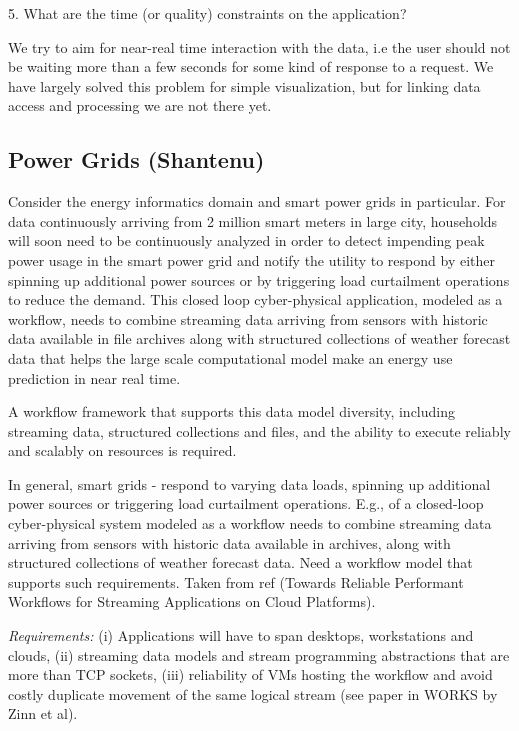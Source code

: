 \documentclass[preprint,12pt]{article}
\begin{document}
5.     What are the time (or quality) constraints on the application?

We try to aim for near-real time interaction with the data, i.e the user should not be waiting more than a few seconds for some kind of response to a request.  We have largely solved this problem for simple visualization, but for linking data access and processing we are not there yet.

\subsection{Power Grids (Shantenu) \label{powerShantenu}}

Consider the energy informatics domain and smart power grids in
particular. For data continuously arriving from 2 million smart meters
in large city, households will soon need to be continuously analyzed
in order to detect impending peak power usage in the smart power grid
and notify the utility to respond by either spinning up additional
power sources or by triggering load curtailment operations to reduce
the demand. This closed loop cyber-physical application, modeled as a
workflow, needs to combine streaming data arriving from sensors with
historic data available in file archives along with structured
collections of weather forecast data that helps the large scale
computational model make an energy use prediction in near real time.

A workflow framework that supports this data model diversity,
including streaming data, structured collections and files, and the
ability to execute reliably and scalably on resources is required.

In general, smart grids - respond to varying data loads, spinning up
additional power sources or triggering load curtailment operations.
E.g., of a closed-loop cyber-physical system modeled as a workflow
needs to combine streaming data arriving from sensors with historic
data available in archives, along with structured collections of
weather forecast data. Need a workflow model that supports such
requirements. Taken from ref (Towards Reliable Performant Workflows
for Streaming Applications on Cloud Platforms).


{\it Requirements: } (i) Applications will have to span desktops,
workstations and clouds, (ii) streaming data models and stream
programming abstractions that are more than TCP sockets, (iii)
reliability of VMs hosting the workflow and avoid costly duplicate
movement of the same logical stream (see paper in WORKS by Zinn et
al).
\end{document}
